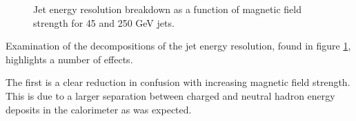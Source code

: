 \begin{figure}
\caption[Jet energy resolution breakdown as a function of magnetic field strength for 45 and 250 GeV jets.]{Jet energy resolution breakdown as a function of magnetic field strength for 45 and 250 GeV jets.}
\label{fig:bfieldbreak}
\end{figure}

Examination of the decompositions of the jet energy resolution, found in figure \ref{fig:bfieldbreak}, highlights a number of effects.  

The first is a clear reduction in confusion with increasing magnetic field strength.  This is due to a larger separation between charged and neutral hadron energy deposits in the calorimeter as was expected.  

